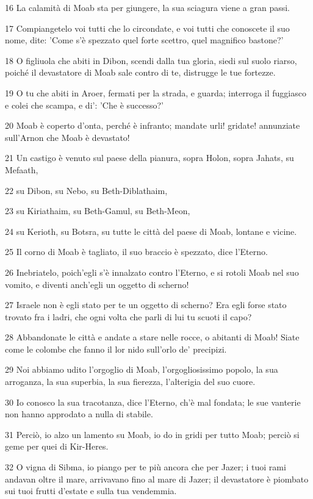 \par 16 La calamità di Moab sta per giungere, la sua sciagura viene a gran passi.
\par 17 Compiangetelo voi tutti che lo circondate, e voi tutti che conoscete il suo nome, dite: 'Come s'è spezzato quel forte scettro, quel magnifico bastone?'
\par 18 O figliuola che abiti in Dibon, scendi dalla tua gloria, siedi sul suolo riarso, poiché il devastatore di Moab sale contro di te, distrugge le tue fortezze.
\par 19 O tu che abiti in Aroer, fermati per la strada, e guarda; interroga il fuggiasco e colei che scampa, e di': 'Che è successo?'
\par 20 Moab è coperto d'onta, perché è infranto; mandate urli! gridate! annunziate sull'Arnon che Moab è devastato!
\par 21 Un castigo è venuto sul paese della pianura, sopra Holon, sopra Jahats, su Mefaath,
\par 22 su Dibon, su Nebo, su Beth-Diblathaim,
\par 23 su Kiriathaim, su Beth-Gamul, su Beth-Meon,
\par 24 su Kerioth, su Botsra, su tutte le città del paese di Moab, lontane e vicine.
\par 25 Il corno di Moab è tagliato, il suo braccio è spezzato, dice l'Eterno.
\par 26 Inebriatelo, poich'egli s'è innalzato contro l'Eterno, e si rotoli Moab nel suo vomito, e diventi anch'egli un oggetto di scherno!
\par 27 Israele non è egli stato per te un oggetto di scherno? Era egli forse stato trovato fra i ladri, che ogni volta che parli di lui tu scuoti il capo?
\par 28 Abbandonate le città e andate a stare nelle rocce, o abitanti di Moab! Siate come le colombe che fanno il lor nido sull'orlo de' precipizi.
\par 29 Noi abbiamo udito l'orgoglio di Moab, l'orgogliosissimo popolo, la sua arroganza, la sua superbia, la sua fierezza, l'alterigia del suo cuore.
\par 30 Io conosco la sua tracotanza, dice l'Eterno, ch'è mal fondata; le sue vanterie non hanno approdato a nulla di stabile.
\par 31 Perciò, io alzo un lamento su Moab, io do in gridi per tutto Moab; perciò si geme per quei di Kir-Heres.
\par 32 O vigna di Sibma, io piango per te più ancora che per Jazer; i tuoi rami andavan oltre il mare, arrivavano fino al mare di Jazer; il devastatore è piombato sui tuoi frutti d'estate e sulla tua vendemmia.
